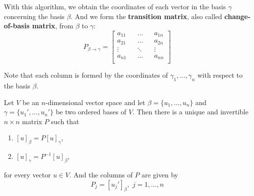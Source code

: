 With this algorithm, we obtain the coordinates of each vector in the basis $\gamma$ concerning the basis $\beta$. And we form the \textbf{transition matrix}, also called \textbf{change-of-basis matrix}, from $\beta$ to $\gamma$:
\[
P_{\beta \to \gamma} =
	\begin{bmatrix} 
	a_{11} && \ldots && a_{1n} \\
	a_{21} && \ldots && a_{2n} \\
	\vdots && \ddots && \vdots \\
	a_{n1} && \ldots && a_{nn} \\
	\end{bmatrix}
\]

Note that each column is formed by the coordinates of $\gamma_1, \ldots, \gamma_n$ with respect to the basis $\beta$.

\begin{theorem}
	Let $V$ be an $n$-dimensional vector space and let $\beta = \{ u_1, \ldots, u_n \}$ and $\gamma = \{ u_1', \ldots, u_n' \}$ be two ordered bases of $V$. Then there is a unique and invertible $n \times n$ matrix $P$ such that 
	\begin{enumerate}
		\item $[u]_\beta = P[u]_\gamma$,
		\item $[u]_\gamma = P^{-1}[u]_\beta$,
	\end{enumerate}
	for every vector $u \in V$. And the columns of $P$ are given by 
	\[
		P_j = [u_j']_\beta, \, \, j = 1, \ldots, n
	\]
\end{theorem}

